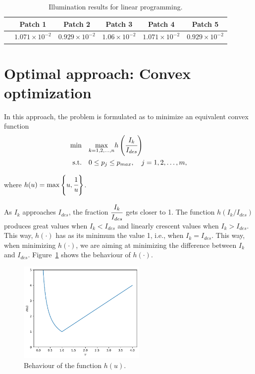 \documentclass[11pt,a4paper]{article}
\begin{document}
\begin{table}[!htb]
    \centering
    \caption{Illumination results for linear programming.}
    \begin{tabular}{lccccc}
        \hline
        & Patch 1 & Patch 2 & Patch 3 & Patch 4 & Patch 5\\
        \hline
        & $1.071\times10^{-2}$ & $0.929\times10^{-2}$ & $1.06\times10^{-2}$ & $1.071\times10^{-2}$ & $0.929\times10^{-2}$\\
        \hline
    \end{tabular}\label{tab:linear-programming}
\end{table}

\section{Optimal approach: Convex optimization}

In this approach, the problem is formulated as to minimize an equivalent convex function 
\begin{equation}
    \begin{aligned}
        \min \quad &  \underset{k = 1, 2, \dots, n}{\max} h\left(\cfrac{I_k}{I_{des}}\right) \\
        \text{s.t.} \quad & 0 \leq p_j \leq p_{max}, \quad j = 1, 2, \dots, m,
    \end{aligned}\label{eq:equivalent-problem}
\end{equation}

where $h(u) = \max\left\{u, \cfrac{1}{u}\right\}$.

As $I_k$ approaches $I_{des}$, the fraction $\cfrac{I_k}{I_{des}}$ gets closer to 1. The function $h(I_k/I_{des})$ produces great values when $I_k < I_{des}$ and linearly crescent values when $I_k > I_{des}$. This way, $h(\cdot)$ has as its minimum the value 1, i.e., when $I_k = I_{des}$. This way, when minimizing $h(\cdot)$, we are aiming at minimizing the difference between $I_k$ and $I_{des}$. Figure~\ref{fig:convex-function} shows the behaviour of $h(\cdot)$.

\begin{figure}[!htb]
    \centering
    \includegraphics[width=0.55\textwidth]{figures/convex-function.pdf}
    \caption{Behaviour of the function $h(u)$.}\label{fig:convex-function}
\end{figure}
\end{document}
